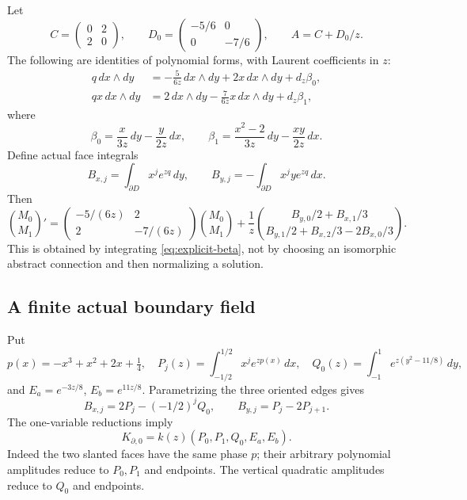 \documentclass[11pt]{article}
\numberwithin{equation}{section}
\theoremstyle{definition}
\theoremstyle{remark}
\newcommand{\dd}{\,d}
\begin{document}
Let
\[
 C=\begin{pmatrix}0&2\\2&0\end{pmatrix},\qquad
 D_0=\begin{pmatrix}-5/6&0\\0&-7/6\end{pmatrix},\qquad A=C+D_0/z.
\]
The following are identities of polynomial forms, with Laurent coefficients
in $z$:
\begin{align}
 q\,dx\wedge dy
 &= -\frac5{6z}\,dx\wedge dy+2x\,dx\wedge dy+d_z\beta_0,\\
 qx\,dx\wedge dy
 &=2\,dx\wedge dy-\frac7{6z}x\,dx\wedge dy+d_z\beta_1,\label{eq:explicit-beta}
\end{align}
where
\[
 \beta_0=\frac{x}{3z}\,dy-\frac{y}{2z}\,dx,
 \qquad
 \beta_1=\frac{x^2-2}{3z}\,dy-\frac{xy}{2z}\,dx.
\]
Define actual face integrals
\[
 B_{x,j}=\int_{\partial D}x^je^{zq}\,dy,
 \qquad
 B_{y,j}=-\int_{\partial D}x^jye^{zq}\,dx.
\]
Then
\begin{equation}\label{eq:elliptic-system}
 \binom{M_0}{M_1}'
 =\begin{pmatrix}-5/(6z)&2\\2&-7/(6z)\end{pmatrix}\binom{M_0}{M_1}
 +\frac1z\binom{B_{y,0}/2+B_{x,1}/3}
 {B_{y,1}/2+B_{x,2}/3-2B_{x,0}/3}.
\end{equation}
This is obtained by integrating \eqref{eq:explicit-beta}, not by choosing
an isomorphic abstract connection and then normalizing a solution.

\subsection{A finite actual boundary field}
Put
\[
 p(x)=-x^3+x^2+2x+\tfrac14,
 \quad P_j(z)=\int_{-1/2}^{1/2}x^j e^{zp(x)}\dd x,
 \quad Q_0(z)=\int_{-1}^{1}e^{z(y^2-11/8)}\dd y,
\]
and $E_a=e^{-3z/8}$, $E_b=e^{11z/8}$. Parametrizing the three oriented
edges gives
\begin{equation}\label{eq:face-identities}
 B_{x,j}=2P_j-(-1/2)^jQ_0,
 \qquad B_{y,j}=P_j-2P_{j+1}.
\end{equation}
The one-variable reductions imply
\begin{equation}\label{eq:boundary-field}
 K_{\partial,0}=k(z)(P_0,P_1,Q_0,E_a,E_b).
\end{equation}
Indeed the two slanted faces have the same phase $p$; their arbitrary
polynomial amplitudes reduce to $P_0,P_1$ and endpoints. The vertical
quadratic amplitudes reduce to $Q_0$ and endpoints.
\end{document}

